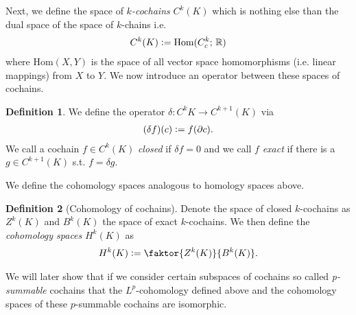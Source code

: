 \documentclass[12pt,a4paper]{article}
\theoremstyle{definition}
\newtheorem{definition}{Definition}
\newcommand{\real}{\mathbb{R}}
\begin{document}
Next, we define the space of \textit{$k$-cochains} $C^k(K)$ which is nothing 
else than the dual space of the space of $k$-chains i.e.
\begin{align*}
    C^k(K) \vcentcolon= \text{Hom}(C^k_c;\, \real)
\end{align*}
where Hom$(X,Y)$ is the space of all vector space homomorphisms (i.e. linear 
mappings) from $X$ to $Y$.
We now introduce an operator between these spaces of cochains.
\begin{definition}
    We define the operator $\delta: C^k{K} \rightarrow C^{k+1}(K)$ via
    \begin{align*}
        (\delta f) (c) \vcentcolon= f(\partial c).
    \end{align*}
    We call a cochain $f \in C^k(K)$ \textit{closed} if $\delta f = 0$ 
    and we call $f$
    \textit{exact} if there is a $g \in C^{k+1}(K)$ s.t. $f = \delta g$.
\end{definition}
We define the cohomology spaces analogous to homology spaces above.
\begin{definition}[Cohomology of cochains]
    Denote the space of closed $k$-cochains as $Z^k(K)$ and $B^k(K)$ the space
    of exact $k$-cochains. We then define the \textit{cohomology spaces}
    $H^k(K)$ as
    \begin{align*}
        H^k(K) \vcentcolon= \faktor{Z^k(K)}{B^k(K)}.
    \end{align*}
\end{definition}
We will later show that if we consider certain subspaces of cochains so called
\textit{p-summable} cochains that the $L^p$-cohomology defined above and the
cohomology spaces of these $p$-summable cochains are isomorphic.
\end{document}
